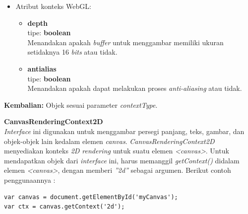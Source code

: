 \documentclass[a4paper,twoside]{article}
\begin{document}
\begin{enumerate}
\begin{enumerate}
\begin{itemize}
\begin{itemize}
\begin{itemize}
						\item Atribut konteks WebGL:
						\begin{itemize}
							\item \textbf{depth} \\ tipe: \textbf{boolean} \\ Menandakan apakah \textit{buffer} untuk menggambar memiliki ukuran setidaknya 16 \textit{bits} atau tidak.
							\item \textbf{antialias} \\tipe: \textbf{boolean} \\ Menandakan apakah dapat melakukan proses \textit{anti-aliasing} atau tidak.
						\end{itemize}
					\end{itemize}
				\end{itemize}
				\textbf{Kembalian:} Objek sesuai parameter \textit{contextType}.
				
			\end{itemize}
			
			\textbf{CanvasRenderingContext2D} \\
			\textit{Interface} ini digunakan untuk menggambar persegi panjang, teks, gambar, dan objek-objek lain kedalam elemen \textit{canvas}. \textit{CanvasRenderingContext2D} menyediakan konteks \textit{2D rendering} untuk suatu elemen \textit{<canvas>}.
			Untuk mendapatkan objek dari \textit{interface} ini, harus memanggil \textit{getContext()} didalam elemen \textit{<canvas>}, dengan memberi \textit{''2d''} sebagai argumen. Berikut contoh penggunaannya :
			
\begin{lstlisting}
var canvas = document.getElementById('myCanvas');
var ctx = canvas.getContext('2d');
\end{lstlisting}
			

\end{enumerate}
\end{enumerate}
\end{document}
